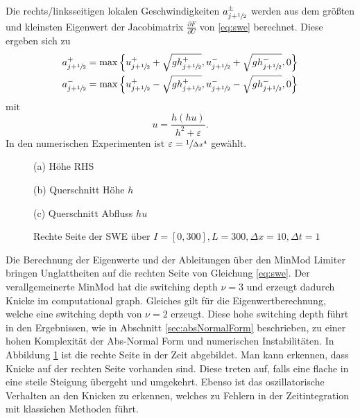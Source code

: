 Die rechts/linksseitigen lokalen Geschwindigkeiten $a^\pm_{j+\sfrac{1}{2}}$ werden aus dem größten und kleinsten Eigenwert der Jacobimatrix $\frac{\partial F}{\partial U}$ von \eqref{eq:swe} berechnet. Diese ergeben sich zu
\[
 \begin{aligned}
 a^+_{j+\sfrac{1}{2}} &= \max \left\lbrace u^+_{j+\sfrac{1}{2}} + \sqrt{gh^+_{j+\sfrac{1}{2}}},u^-_{j+\sfrac{1}{2}} + \sqrt{gh^-_{j+\sfrac{1}{2}}},0\right\rbrace\\
 a^-_{j+\sfrac{1}{2}} &= \max \left\lbrace u^+_{j+\sfrac{1}{2}} - \sqrt{gh^+_{j+\sfrac{1}{2}}},u^-_{j+\sfrac{1}{2}} - \sqrt{gh^-_{j+\sfrac{1}{2}}},0\right\rbrace
 \end{aligned}
\]
mit \begin{equation}
u=\frac{h(hu)}{h^2 + \varepsilon}.
\label{eq:sweHuToU}
    \end{equation}
In den numerischen Experimenten ist $\varepsilon = \sfrac{1}{\Delta x^4}$ gewählt.
\begin{figure}
\footnotesize
\centering
\begin{minipage}[b]{\linewidth}

\caption*{(a) Höhe RHS}
\end{minipage}
\begin{minipage}[b]{0.49\linewidth}

\caption*{(b) Querschnitt Höhe $h$}
\end{minipage}
\begin{minipage}[b]{0.49\linewidth}

\caption*{(c) Querschnitt Abfluss $hu$}
\end{minipage}
\caption{Rechte Seite der SWE über $I=[0,300], L=300, \Delta x=10, \Delta t = 1$}
\label{fig:sweGrad}
\end{figure}


Die Berechnung der Eigenwerte und der Ableitungen über den MinMod Limiter bringen Unglattheiten auf die rechten Seite von Gleichung \eqref{eq:swe}.  Der verallgemeinerte MinMod hat die switching depth $\nu = 3$ und erzeugt dadurch Knicke im computational graph. Gleiches gilt für die Eigenwertberechnung, welche eine switching depth von $\nu = 2$ erzeugt. Diese hohe switching depth führt in den Ergebnissen, wie in Abschnitt \ref{sec:absNormalForm} beschrieben, zu einer hohen Komplexität der Abs-Normal Form und numerischen Instabilitäten. In Abbildung \ref{fig:sweGrad} ist die rechte Seite in der Zeit abgebildet. Man kann erkennen, dass Knicke auf der rechten Seite vorhanden sind. Diese treten auf, falls eine flache in eine steile Steigung übergeht und umgekehrt. Ebenso ist das oszillatorische Verhalten an den Knicken zu erkennen, welches zu Fehlern in der Zeitintegration mit klassichen Methoden führt.

